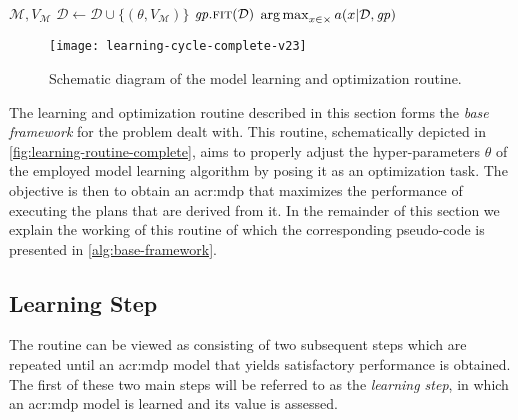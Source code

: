 \begin{algorithm}[t!]
\begin{algorithmic}[1]
			\State\Return $\mathcal{M}, V_\mathcal{M}$
		\EndFunction
		\Statex
			\State $\mathcal{D} \gets \mathcal{D} \cup \{(\theta, V_\mathcal{M})\}$
			\State $\mathit{gp}.\textproc{fit}(\mathcal{D})$	
			\State\Return $\operatorname*{arg\,max}_{x \in \mathcal{\Theta}} a(x \vert \mathcal{D}, \mathit{gp})$	
		\EndFunction
	\end{algorithmic}
\end{algorithm}

\begin{figure}[t]
	\centering
	\texttt{[image: learning-cycle-complete-v23]}
	\caption{Schematic diagram of the model learning and optimization routine.}
	\label{fig:learning-routine-complete}
\end{figure}

The learning and optimization routine described in this section forms the \textit{base framework} for the problem dealt with.
This routine, schematically depicted in \autoref{fig:learning-routine-complete}, aims to properly adjust the hyper-parameters $\theta$ of the employed model learning algorithm by posing it as an optimization task.
The objective is then to obtain an \acrshort{acr:mdp} that maximizes the performance of executing the plans that are derived from it.
In the remainder of this section we explain the working of this routine of which the corresponding pseudo-code is presented in \autoref{alg:base-framework}.


\subsection{Learning Step}
\label{sec:learning-step}

The routine can be viewed as consisting of two subsequent steps which are repeated until an \acrshort{acr:mdp} model that yields satisfactory performance is obtained.
The first of these two main steps will be referred to as the \textit{learning step}, in which an \acrshort{acr:mdp} model is learned and its value is assessed.

